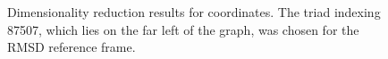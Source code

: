 \documentclass[a4paper]{article}
\begin{document}
\begin{figure}[H]
    \caption{Dimensionality reduction results for coordinates. The triad indexing 87507, which lies on the far left of the graph, was chosen for the RMSD reference frame.  }
    \label{fig:dimreduct_coordinates}
\end{figure}

\pagebreak


\end{document}
